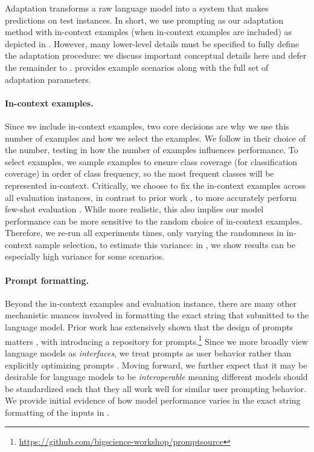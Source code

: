 Adaptation transforms a raw language model into a system that makes predictions on test instances.
In short, we use prompting as our adaptation method with \numincontext in-context examples (when in-context examples are included) as depicted in .
However, many lower-level details must be specified to fully define the adaptation procedure: we discuss important conceptual details here and defer the remainder to .
 provides example scenarios along with the full set of adaptation parameters.

\paragraph{In-context examples.}
Since we include \numincontext in-context examples, two core decisions are why we use this number of examples and how we select the examples.
We follow \citet{brown2020gpt3} in their choice of the number, testing in  how the number of examples influences performance. 
To select examples, we sample examples to ensure class coverage (for classification coverage) in order of class frequency, so the \numincontext most frequent classes will be represented in-context.
Critically, we choose to fix the in-context examples across all evaluation instances, in contrast to prior work \citep[\eg][]{brown2020gpt3}, to more accurately perform few-shot evaluation \citep{perez2021true}.
While more realistic, this also implies our model performance can be more sensitive to the random choice of in-context examples.
Therefore, we re-run all experiments \numruns times, only varying the randomness in in-context sample selection, to estimate this variance: in , we show results can be especially high variance for some scenarios.

\paragraph{Prompt formatting.}
Beyond the in-context examples and evaluation instance, there are many other mechanistic nuances involved in formatting the exact string that submitted to the language model.
Prior work has extensively shown that the design of prompts matters \citep{lescao2021prompt, liu2022incontext}, with \citet{bach2022promptsource} introducing a repository for prompts.\footnote{\url{https://github.com/bigscience-workshop/promptsource}}
Since we more broadly view language models as \textit{interfaces}, we treat prompts as user behavior rather than explicitly optimizing prompts \citep{shin2020autoprompt, zhou2022large}.
Moving forward, we further expect that it may be desirable for language models to be \textit{interoperable} meaning different models should be standardized such that they all work well for similar user prompting behavior.
We provide initial evidence of how model performance varies in the exact string formatting of the inputs in .

